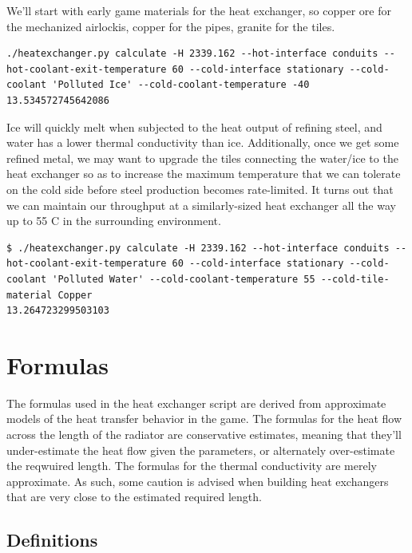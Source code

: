 \documentclass{article}
\numberwithin{equation}{subsection}
\theoremstyle{remark}
\begin{document}
We'll start with early game materials for the heat exchanger, so copper ore for the mechanized airlockis, copper for the pipes, granite for the tiles.

\begin{verbatim}
./heatexchanger.py calculate -H 2339.162 --hot-interface conduits --hot-coolant-exit-temperature 60 --cold-interface stationary --cold-coolant 'Polluted Ice' --cold-coolant-temperature -40
13.534572745642086
\end{verbatim}

Ice will quickly melt when subjected to the heat output of refining steel, and water has a lower thermal conductivity than ice.
Additionally, once we get some refined metal, we may want to upgrade the tiles connecting the water/ice to the heat exchanger so as to increase the maximum temperature that we can tolerate on the cold side before steel production becomes rate-limited.
It turns out that we can maintain our throughput at a similarly-sized heat exchanger all the way up to 55 \degree{}C in the surrounding environment.

\begin{verbatim}
$ ./heatexchanger.py calculate -H 2339.162 --hot-interface conduits --hot-coolant-exit-temperature 60 --cold-interface stationary --cold-coolant 'Polluted Water' --cold-coolant-temperature 55 --cold-tile-material Copper
13.264723299503103
\end{verbatim}

\section{Formulas}

The formulas used in the heat exchanger script are derived from approximate models of the heat transfer behavior in the game.
The formulas for the heat flow across the length of the radiator are conservative estimates, meaning that they'll under-estimate the heat flow given the parameters, or alternately over-estimate the reqwuired length.
The formulas for the thermal conductivity are merely approximate.
As such, some caution is advised when building heat exchangers that are very close to the estimated required length.

\subsection{Definitions}
\end{document}
